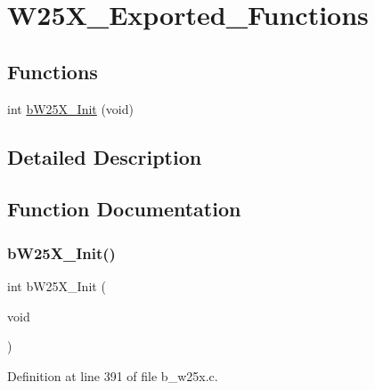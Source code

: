\hypertarget{group___w25_x___exported___functions}{}\section{W25\+X\+\_\+\+Exported\+\_\+\+Functions}
\label{group___w25_x___exported___functions}
\subsection*{Functions}
\begin{DoxyCompactItemize}
\item 
int \mbox{\hyperlink{group___w25_x___exported___functions_gaf21a484dde17ecbe3be7b7ce034325e7}{b\+W25\+X\+\_\+\+Init}} (void)
\end{DoxyCompactItemize}


\subsection{Detailed Description}


\subsection{Function Documentation}
\mbox{\label{group___w25_x___exported___functions_gaf21a484dde17ecbe3be7b7ce034325e7}} 
\subsubsection{\texorpdfstring{b\+W25\+X\+\_\+\+Init()}{bW25X\_Init()}}
{\footnotesize\ttfamily int b\+W25\+X\+\_\+\+Init (\begin{DoxyParamCaption}\item[{void}]{ }\end{DoxyParamCaption})}



Definition at line 391 of file b\+\_\+w25x.\+c.


